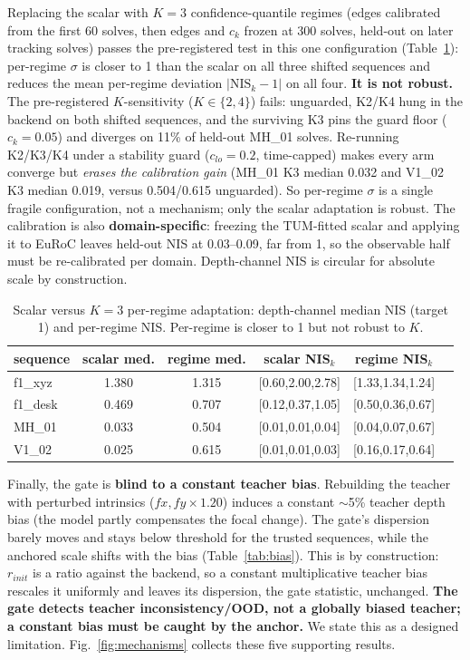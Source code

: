Replacing the scalar with $K{=}3$ confidence-quantile regimes (edges calibrated
from the first 60 solves, then edges and $c_k$ frozen at 300 solves, held-out on
later tracking solves) passes the pre-registered test in this one configuration
(Table~\ref{tab:sigma}): per-regime $\sigma$ is closer to 1 than the scalar on
all three shifted sequences and reduces the mean per-regime deviation
$|\mathrm{NIS}_k-1|$ on all four. \textbf{It is not robust.} The pre-registered
$K$-sensitivity ($K\in\{2,4\}$) fails: unguarded, K2/K4 hung in the backend on
both shifted sequences, and the surviving K3 pins the guard floor ($c_k=0.05$)
and diverges on 11\% of held-out MH\_01 solves. Re-running K2/K3/K4 under a
stability guard ($c_{lo}=0.2$, time-capped) makes every arm converge but
\emph{erases the calibration gain} (MH\_01 K3 median 0.032 and V1\_02 K3 median
0.019, versus 0.504/0.615 unguarded). So per-regime $\sigma$ is a single fragile
configuration, not a mechanism; only the scalar adaptation is robust. The
calibration is also \textbf{domain-specific}: freezing the TUM-fitted scalar and
applying it to EuRoC leaves held-out NIS at 0.03--0.09, far from 1, so the
observable half must be re-calibrated per domain. Depth-channel NIS is circular
for absolute scale by construction.

\begin{table}[t]
\centering
\caption{Scalar versus $K{=}3$ per-regime adaptation: depth-channel median NIS
(target 1) and per-regime NIS. Per-regime is closer to 1 but not robust to $K$.}
\label{tab:sigma}
\footnotesize
\setlength{\tabcolsep}{3pt}
\begin{tabular}{@{}lccccc@{}}
\toprule
sequence & scalar med. & regime med. & scalar NIS$_k$ & regime NIS$_k$ \\
\midrule
f1\_xyz & 1.380 & 1.315 & [0.60,2.00,2.78] & [1.33,1.34,1.24] \\
f1\_desk & 0.469 & 0.707 & [0.12,0.37,1.05] & [0.50,0.36,0.67] \\
MH\_01 & 0.033 & 0.504 & [0.01,0.01,0.04] & [0.04,0.07,0.67] \\
V1\_02 & 0.025 & 0.615 & [0.01,0.01,0.03] & [0.16,0.17,0.64] \\
\bottomrule
\end{tabular}
\end{table}

Finally, the gate is \textbf{blind to a constant teacher bias}. Rebuilding the
teacher with perturbed intrinsics ($fx, fy \times 1.20$) induces a constant
$\sim$5\% teacher depth bias (the model partly compensates the focal change). The
gate's dispersion barely moves and stays below threshold for the trusted
sequences, while the anchored scale shifts with the bias (Table~\ref{tab:bias}).
This is by construction: $r_{init}$ is a ratio against the backend, so a constant
multiplicative teacher bias rescales it uniformly and leaves its dispersion, the
gate statistic, unchanged. \textbf{The gate detects teacher inconsistency/OOD,
not a globally biased teacher; a constant bias must be caught by the anchor.} We
state this as a designed limitation. Fig.~\ref{fig:mechanisms} collects these
five supporting results.

